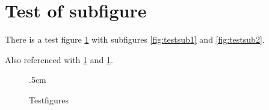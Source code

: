 \documentclass{article}
\begin{document}
\setcounter{lofdepth}{2}
\listoffigures
\clearpage

\section{Test of subfigure}

There is a test figure \ref{fig:test} with subfigures
\ref{fig:testsub1} and \ref{fig:testsub2}.

Also referenced with \ref{fig:test} and
\ref{fig:test}.

\begin{figure}[!ht]
    \centering
    \unitlength .5cm
     \qquad
     \\
    \caption{Testfigures}
    \label{fig:test}
\end{figure}
\end{document}
